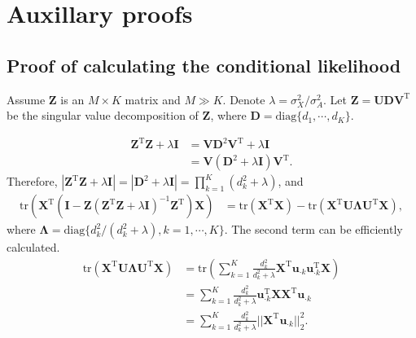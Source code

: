 \documentclass{article}
\begin{document}
\begin{appendices}
\begin{algorithm}
{    }
  \end{algorithm}

  \section{Auxillary proofs}
  \subsection{Proof of calculating the conditional likelihood}\label{app::proof1}
    Assume $\mathbf{Z}$ is an $M\times K$ matrix and $M\gg K$. Denote $\lambda = \sigma_X^2 / \sigma_A^2$.
    Let $\mathbf{Z} = \mathbf{U}\mathbf{D}\mathbf{V}^\mathrm{T}$ be the singular value decomposition of $\mathbf{Z}$, where $\mathbf{D} = \mathrm{diag}\{d_1,\cdots, d_K\}$. 

    \begin{equation}
    \begin{aligned}
      \mathbf{Z}^\mathrm{T}\mathbf{Z} + \lambda \mathbf{I} &= \mathbf{V}\mathbf{D}^2 \mathbf{V}^\mathrm{T} + \lambda \mathbf{I} \\
      &= \mathbf{V} (\mathbf{D}^2 + \lambda \mathbf{I}) \mathbf{V}^\mathrm{T}.
    \end{aligned}
  \end{equation}
    Therefore, $|{\mathbf{Z}}^{\mathrm{T}}\mathbf{Z} + \lambda \mathbf{I}| = |\mathbf{D}^2 + \lambda \mathbf{I}| = \prod_{k=1}^K (d_k^2 + \lambda)$, and
    \begin{equation}
    \begin{aligned}
      \mathrm{tr}\left( \mathbf{X}^\mathrm{T} \left(\mathbf{I} -  \mathbf{Z} \left(\mathbf{Z}^\mathrm{T}\mathbf{Z} + \lambda \mathbf{I} \right)^{-1} \mathbf{Z}^\mathrm{T} \right) \mathbf{X} \right) &= \mathrm{tr}\left( {\mathbf{X}}^{\mathrm{T}} \mathbf{X}\right) - \mathrm{tr}\left( \mathbf{X}^\mathrm{T}\mathbf{U}\mathbf{\Lambda}\mathbf{U}^\mathrm{T}\mathbf{X} \right),
    \end{aligned}
  \end{equation}
    where $\mathbf{\Lambda} = \mathrm{diag}\{d_k^2/(d_k^2 + \lambda), k = 1,\cdots, K\}$. 
    The second term can be efficiently calculated. \begin{equation}
    \begin{aligned}
      \mathrm{tr}(\mathbf{X}^\mathrm{T}\mathbf{U}\mathbf{\Lambda}\mathbf{U}^\mathrm{T}\mathbf{X}) &= \mathrm{tr}\left(\sum_{k = 1}^K \frac{d_k^2}{d_k^2 + \lambda}{\mathbf{X}}^{\mathrm{T}}\boldsymbol{u}_{\cdot k}\boldsymbol{u}_{\cdot k}^\mathrm{T}\mathbf{X}\right) \\
      &= \sum_{k=1}^K \frac{d_k^2}{d_k^2 + \lambda}\boldsymbol{u}_{\cdot k}^\mathrm{T}\mathbf{X}{\mathbf{X}}^{\mathrm{T}}\boldsymbol{u}_{\cdot k}\\ 
      &= \sum_{k=1}^K \frac{d_k^2}{d_k^2 + \lambda}||{\mathbf{X}}^{\mathrm{T}}\boldsymbol{u}_{\cdot k}||_2^2.
    \end{aligned}
  \end{equation}

\end{appendices}
\end{document}
